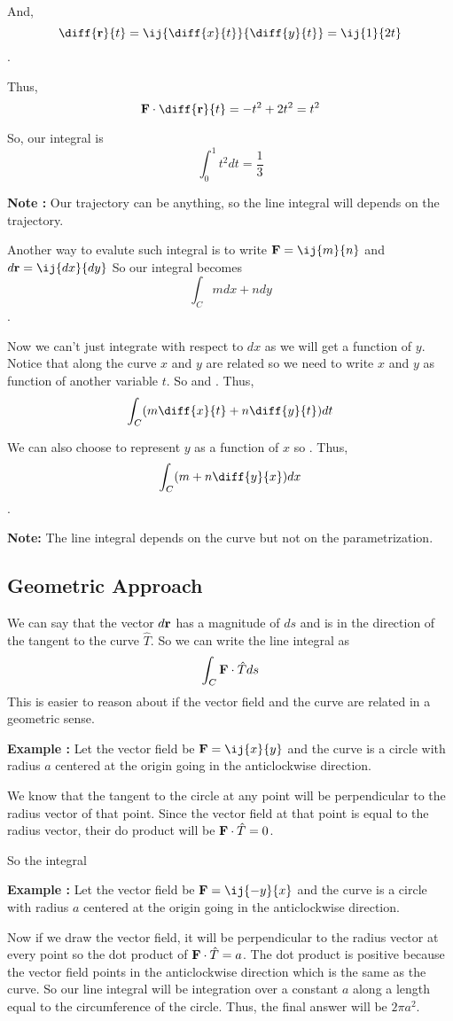 And, 
$$\diff{{\bf r}}{t} = \ij{\diff{x}{t}}{\diff{y}{t}} = \ij{1}{2t} $$.

Thus, $${\bf F} \cdot \diff{{\bf r}}{t} = -t^2 + 2t^2 = t^2$$

So, our integral is $$ \int_0^1 t^2 dt = \frac{1}{3} $$ 


{\bf Note : } Our trajectory can be anything, so the line integral will depends on the trajectory.

Another way to evalute such integral is to write ${\bf F} = \ij{m}{n}$ and $d{\bf r} = \ij{dx}{dy}$
So our integral becomes $$ \int_C mdx + ndy $$.

Now we can't just integrate with respect to $dx$ as we will get a function of $y$.
Notice that along the curve $x$ and $y$ are related so we need to write $x$ and $y$ as function of another variable $t$.
So   and .
Thus, 
$$ \int_C (m\diff{x}{t} + n\diff{y}{t}) dt $$

We can also choose to represent $y$ as a function of $x$ so .
Thus, $$ \int_C (m + n \diff{y}{x}) dx $$.

{\bf Note: } The line integral depends on the curve but not on the parametrization. 


\subsection{Geometric Approach}

We can say that the vector $d{\bf r}$ has a magnitude of $ds$ and is in the direction of the tangent to the curve $\hat{T}$.
So we can write the line integral as $$ \int_C {\bf F} \cdot \hat{T} ds $$
This is easier to reason about if the vector field and the curve are related in a geometric sense.

{\bf Example : } Let the vector field be ${\bf F} = \ij{x}{y}$ and the curve is a circle with radius $a$ centered at the origin going in the anticlockwise direction.

We know that the tangent to the circle at any point will be perpendicular to the radius vector of that point.
Since the vector field at that point is equal to the radius vector, their do product will be ${\bf F} \cdot \hat{T} = 0$.

So the integral 

{\bf Example : } Let the vector field be ${\bf F} = \ij{-y}{x}$ and the curve is a circle with radius $a$ centered at the origin going in the anticlockwise direction.

Now if we draw the vector field, it will be perpendicular to the radius vector at every point so the dot product of ${\bf F} \cdot \hat{T} = a$.
The dot product is positive because the vector field points in the anticlockwise direction which is the same as the curve.
So our line integral will be integration over a constant $a$ along a length equal to the circumference of the circle.
Thus, the final answer will be $2 \pi a^2$.